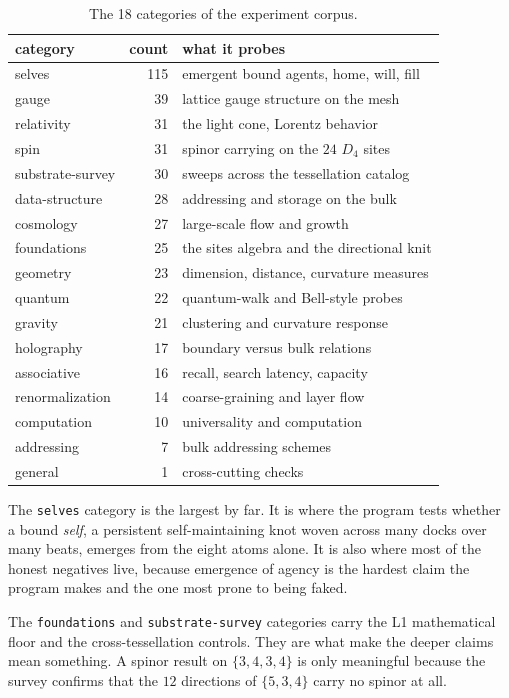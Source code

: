 \begin{table}[ht]
\centering
\begin{tabular}{@{}lrl@{}}
\toprule
category & count & what it probes \\
\midrule
selves & 115 & emergent bound agents, home, will, fill \\
gauge & 39 & lattice gauge structure on the mesh \\
relativity & 31 & the light cone, Lorentz behavior \\
spin & 31 & spinor carrying on the $24$ $D_4$ sites \\
substrate-survey & 30 & sweeps across the tessellation catalog \\
data-structure & 28 & addressing and storage on the bulk \\
cosmology & 27 & large-scale flow and growth \\
foundations & 25 & the sites algebra and the directional knit \\
geometry & 23 & dimension, distance, curvature measures \\
quantum & 22 & quantum-walk and Bell-style probes \\
gravity & 21 & clustering and curvature response \\
holography & 17 & boundary versus bulk relations \\
associative & 16 & recall, search latency, capacity \\
renormalization & 14 & coarse-graining and layer flow \\
computation & 10 & universality and computation \\
addressing & 7 & bulk addressing schemes \\
general & 1 & cross-cutting checks \\
\bottomrule
\end{tabular}
\caption{The 18 categories of the experiment corpus.}
\label{tab:categories}
\end{table}

The \texttt{selves} category is the largest by far. It is where the program tests whether a bound \emph{self}, a persistent self-maintaining knot woven across many docks over many beats, emerges from the eight atoms alone. It is also where most of the honest negatives live, because emergence of agency is the hardest claim the program makes and the one most prone to being faked.

The \texttt{foundations} and \texttt{substrate-survey} categories carry the L1 mathematical floor and the cross-tessellation controls. They are what make the deeper claims mean something. A spinor result on $\{3,4,3,4\}$ is only meaningful because the survey confirms that the $12$ directions of $\{5,3,4\}$ carry no spinor at all.

